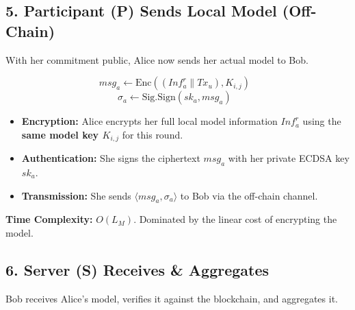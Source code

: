 \documentclass[12pt]{article}
\begin{document}
\subsection*{5. Participant (P) Sends Local Model (Off-Chain)}
With her commitment public, Alice now sends her actual model to Bob.

\[
msg_a \leftarrow \text{Enc}((Inf_a^r \parallel Tx_u), K_{i,j}) \text{ }
\]
\[
\sigma_a \leftarrow \text{Sig.Sign}(sk_a, msg_a) \text{ }
\]
\begin{itemize}
    \item \textbf{Encryption:} Alice encrypts her full local model information \( Inf_a^r \) using the \textbf{same model key \( K_{i,j} \)} for this round.
    \item \textbf{Authentication:} She signs the ciphertext \( msg_a \) with her private ECDSA key \( sk_a \).
    \item \textbf{Transmission:} She sends \( \langle msg_a, \sigma_a \rangle \) to Bob via the off-chain channel.
\end{itemize}
\textbf{Time Complexity:} \( O(L_M) \). Dominated by the linear cost of encrypting the model.

\subsection*{6. Server (S) Receives \& Aggregates}
Bob receives Alice's model, verifies it against the blockchain, and aggregates it.
\end{document}
